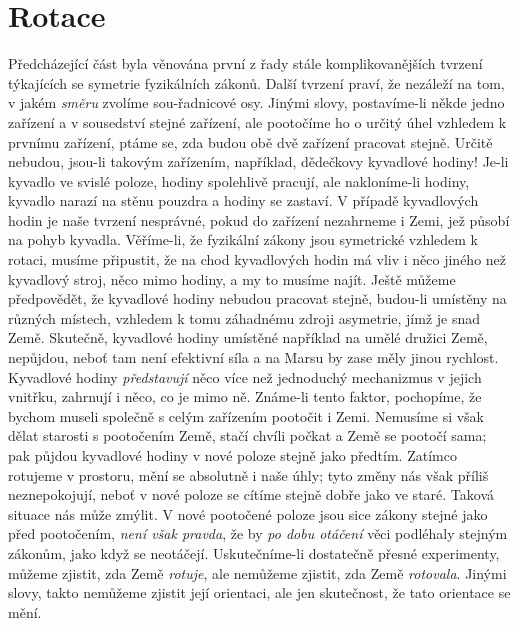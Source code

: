 {  \section{Rotace}
    Předcházející část byla věnována první z řady stále komplikovanějších tvrzení týkajících se 
    symetrie fyzikálních zákonů. Další tvrzení praví, že nezáleží na tom, v jakém \emph{směru} 
    zvolíme sou-řadnicové osy. Jinými slovy, postavíme-li někde jedno zařízení a v sousedství 
    stejné zařízení, ale pootočíme ho o určitý úhel vzhledem k prvnímu zařízení, ptáme se, zda 
    budou obě dvě zařízení pracovat stejně. Určitě nebudou, jsou-li takovým zařízením, například, 
    dědečkovy kyvadlové hodiny! Je-li kyvadlo ve svislé poloze, hodiny spolehlivě pracují, ale 
    nakloníme-li hodiny, kyvadlo narazí na stěnu pouzdra a hodiny se zastaví. V případě kyvadlových 
    hodin je naše tvrzení nesprávné, pokud do zařízení nezahrneme i Zemi, jež působí na pohyb 
    kyvadla. Věříme-li, že fyzikální zákony jsou symetrické vzhledem k rotaci, musíme připustit, že 
    na chod kyvadlových hodin má vliv i něco jiného než kyvadlový stroj, něco mimo hodiny, a my to 
    musíme najít. Ještě můžeme předpovědět, že kyvadlové hodiny nebudou pracovat stejně, budou-li 
    umístěny na různých místech, vzhledem k tomu záhadnému zdroji asymetrie, jímž je snad Země. 
    Skutečně, kyvadlové hodiny umístěné například na umělé družici Země, nepůjdou, neboť tam není 
    efektivní síla a na Marsu by zase měly jinou rychlost. Kyvadlové hodiny \emph{představují} něco 
    více než jednoduchý mechanizmus v jejich vnitřku, zahrnují i něco, co je mimo ně. Známe-li 
    tento faktor, pochopíme, že bychom museli společně s celým zařízením pootočit i Zemi. Nemusíme 
    si však dělat starosti s pootočením Země, stačí chvíli počkat a Země se pootočí sama; pak 
    půjdou kyvadlové hodiny v nové poloze stejně jako předtím. Zatímco rotujeme v prostoru, mění se 
    absolutně i naše úhly; tyto změny nás však příliš neznepokojují, neboť v nové poloze se cítíme 
    stejně dobře jako ve staré. Taková situace nás může zmýlit. V nové pootočené poloze jsou sice 
    zákony stejné jako před pootočením, \emph{není však pravda}, že by \emph{po dobu otáčení} věci 
    podléhaly stejným zákonům, jako když se neotáčejí. Uskutečníme-li dostatečně přesné 
    experimenty, můžeme zjistit, zda Země \emph{rotuje}, ale nemůžeme zjistit, zda Země 
    \emph{rotovala}. Jinými slovy, takto nemůžeme zjistit její orientaci, ale jen skutečnost, že 
    tato orientace se mění.

}
